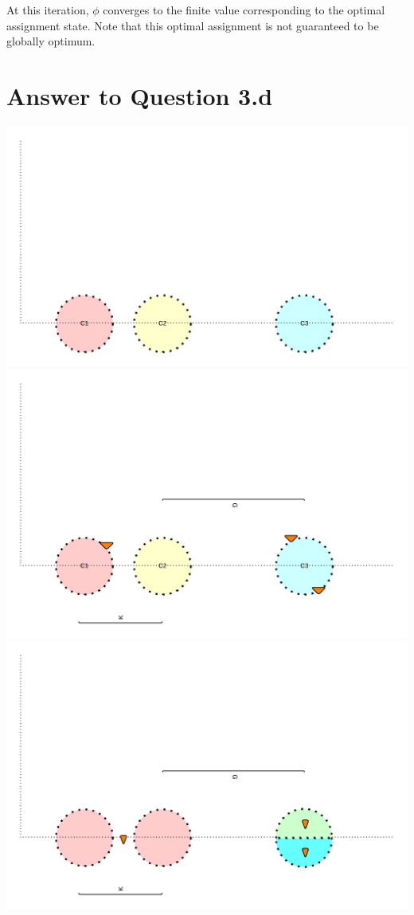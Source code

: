 \documentclass[11pt]{article}
\begin{document}
{At this iteration, $\phi$ converges to the finite value corresponding to the optimal assignment state. Note that this optimal assignment is not guaranteed to be globally optimum.

\pagebreak[4]
\section*{Answer to Question 3.d}
\includegraphics[scale=0.8]{q3_1} \\
\includegraphics[scale=0.8]{q3_2} \\
\includegraphics[scale=0.8]{q3_3}

}
\end{document}
